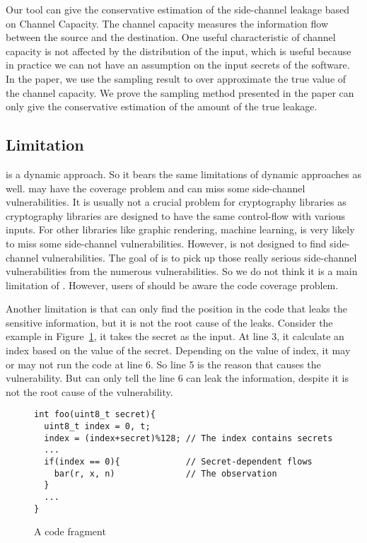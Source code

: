 Our tool can give the conservative estimation of the side-channel leakage based on Channel Capacity. The channel capacity measures  the information flow between the source and the destination. One useful characteristic of channel capacity is not affected by the distribution of the input, which is useful because in practice we can not have an assumption on the input secrets of the software. In the paper, we use the sampling result to over approximate the true value of the channel capacity. We prove the sampling method presented in the paper can only give the conservative estimation of the amount of the true leakage.

\subsection{Limitation}
\tool{} is a dynamic approach. So it bears the same limitations of dynamic approaches as well. \tool{} may have the coverage problem and can miss some side-channel vulnerabilities. It is usually not a crucial problem for cryptography libraries as cryptography libraries are designed to have the same control-flow with various inputs. For other libraries like graphic rendering, machine learning, \tool{} is very likely to miss some side-channel vulnerabilities. However, \tool{} is not designed to find side-channel vulnerabilities. The goal of \tool{} is to pick up those really serious side-channel vulnerabilities from the numerous vulnerabilities. So we do not think it is a main limitation of \tool{}. However, users of \tool{} should be aware the code coverage problem. 

Another limitation is that \tool{} can only find the position in the code that leaks the sensitive information, but it is not the root cause of the leaks. Consider the example in Figure~\ref{fig:limitation}, it takes the secret as the input. At line 3, it calculate an index based on the value of the secret. Depending on the value of index, it may or may not run the code at line 6. So line 5 is the reason that causes the vulnerability. But \tool{} can only tell the line 6 can leak the information, despite it is not the root cause of the vulnerability. 

\begin{figure}
\centering
\begin{lstlisting}[xleftmargin=.02\textwidth,xrightmargin=.01\textwidth]
int foo(uint8_t secret){
  uint8_t index = 0, t;
  index = (index+secret)%128; // The index contains secrets
  ...
  if(index == 0){             // Secret-dependent flows
    bar(r, x, n)              // The observation
  }
  ...
}
\end{lstlisting}
    \caption{A code fragment}
    \label{fig:limitation}
\end{figure}
